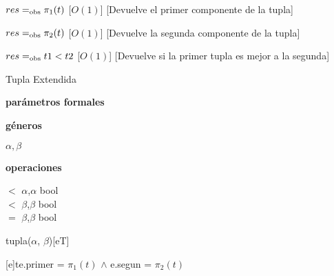 \begin{Interfaz}
	{$res =_{\mathrm{obs}} \pi_1 (t)$}
	[$O(1)$]
	[Devuelve el primer componente de la tupla]

	{$res =_{\mathrm{obs}} \pi_2 (t)$}
	[$O(1)$]
	[Devuelve la segunda componente de la tupla]

	{$res =_{\mathrm{obs}} t1 < t2$}
	[$O(1)$]
	[Devuelve si la primer tupla es mejor a la segunda]


	\begin{tad}{Tupla Extendida}
	\parskip=0pt

	\textbf{parámetros formales}\parindent\\
	\parbox{1.7cm}{\textbf{géneros}}$\alpha,\beta$\\
	\parbox{\parindent+1.7cm}{\textbf{operaciones}}\parbox[t]{\textwidth-\parindent-1.7cm}{
		\tadOperacionInline
		{\puntito $<$ \puntito}
		{$\alpha$,$\alpha$}
		{bool}\\
		\tadOperacionInline
		{\puntito $<$ \puntito}
		{$\beta$,$\beta$}
		{bool}\\
		\tadOperacionInline
		{\puntito $=$ \puntito}
		{$\beta$,$\beta$}
		{bool}
	}


	
	\tadAxiomas


	\end{tad}

\end{Interfaz}


\begin{Representacion}

	\begin{Estructura}{tupla($\alpha$, $\beta$)}[eT]
		\begin{Tupla}[eT]
		\end{Tupla}
	\end{Estructura}





	{t}{e.primer = $\pi_1 (t)$ $\land$ e.segun = $\pi_2 (t)$}
\end{Representacion}


